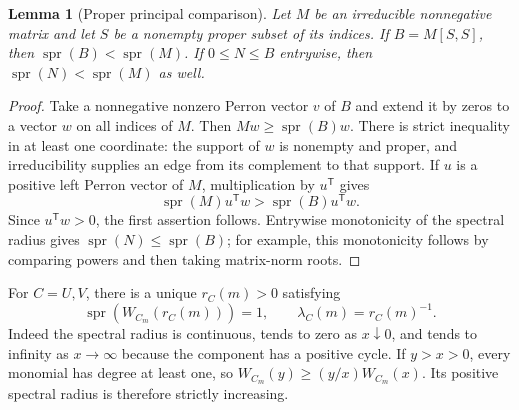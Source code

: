 \documentclass[11pt,a4paper]{article}
\newtheorem{lemma}[lemma]{Lemma}
\theoremstyle{definition}\newaliascnt{definition}{theorem}
\theoremstyle{remark}\newaliascnt{remark}{theorem}
\newcommand{\spr}{\operatorname{spr}}
\begin{document}
\begin{lemma}[Proper principal comparison]\label{lem:PF}
Let $M$ be an irreducible nonnegative matrix and let $S$ be a nonempty proper
subset of its indices. If $B=M[S,S]$, then $\spr(B)<\spr(M)$.
If $0\le N\le B$ entrywise, then $\spr(N)<\spr(M)$ as well.
\end{lemma}
\begin{proof}
Take a nonnegative nonzero Perron vector $v$ of $B$ and extend it by zeros to
a vector $w$ on all indices of $M$. Then $Mw\ge\spr(B)w$. There is strict
inequality in at least one coordinate: the support of $w$ is nonempty and
proper, and irreducibility supplies an edge from its complement to that
support. If $u$ is a positive left Perron vector of $M$, multiplication by
$u^{\mathsf T}$ gives
\[
 \spr(M)u^{\mathsf T}w>\spr(B)u^{\mathsf T}w.
\]
Since $u^{\mathsf T}w>0$, the first assertion follows. Entrywise monotonicity
of the spectral radius gives $\spr(N)\le\spr(B)$; for example, this
monotonicity follows by comparing powers and then taking matrix-norm roots.
\end{proof}

For $C=U,V$, there is a unique $r_C(m)>0$ satisfying
\begin{equation}
 \spr(W_{C_m}(r_C(m)))=1,
 \qquad \lambda_C(m)=r_C(m)^{-1}.
 \label{eq:component-root}
\end{equation}
Indeed the spectral radius is continuous, tends to zero as $x\downarrow0$,
and tends to infinity as $x\to\infty$ because the component has a positive
cycle. If $y>x>0$, every monomial has degree at least one, so
$W_{C_m}(y)\ge(y/x)W_{C_m}(x)$. Its positive spectral radius is therefore
strictly increasing.
\end{document}
